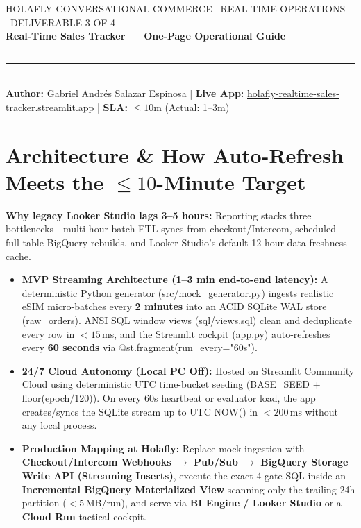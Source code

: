 \documentclass[10pt,letterpaper]{article}
\newcommand{\eyebrow}[1]{{\fontfamily{pcr}\selectfont\fontsize{7.2}{8.5}\selectfont\color{graphite}\MakeUppercase{#1}}}
\newcommand{\code}[1]{{\fontfamily{pcr}\selectfont\footnotesize\color{ink}#1}}
\newcommand{\hbullet}{\textcolor{holaflyred}{\rule[0.45ex]{0.40ex}{0.40ex}}}
\begin{document}
\fontsize{8.35}{10.5}\selectfont

\eyebrow{Holafly Conversational Commerce \textperiodcentered\ Real-Time Operations \textperiodcentered\ Deliverable 3 of 4}\\[1.5pt]
{\fontsize{14.8}{17}\selectfont\bfseries\color{ink}Real-Time Sales Tracker — One-Page Operational Guide}\\[2.5pt]
{\color{holaflyred}\rule{1.40in}{1.8pt}}{\color{hairline}\rule{\dimexpr\textwidth-1.40in\relax}{0.6pt}}\\[2.5pt]
{\fontsize{7.9}{9.4}\selectfont\color{iron}%
\textbf{Author:} Gabriel Andr\'es Salazar Espinosa \quad|\quad
\textbf{Live App:} \href{https://holafly-realtime-sales-tracker.streamlit.app/}{\code{holafly-realtime-sales-tracker.streamlit.app}} \quad|\quad
\textbf{SLA:} $\leq 10$m (Actual: 1--3m)}

\section{Architecture \& How Auto-Refresh Meets the $\leq 10$-Minute Target}
\textbf{Why legacy Looker Studio lags 3--5 hours:} Reporting stacks three bottlenecks---multi-hour batch ETL syncs from checkout/Intercom, scheduled full-table BigQuery rebuilds, and Looker Studio's default 12-hour data freshness cache.
\begin{itemize}[leftmargin=1.15em, itemsep=1.4pt, topsep=1.5pt, label=\hbullet]
  \item \textbf{MVP Streaming Architecture (1--3 min end-to-end latency):} A deterministic Python generator (\code{src/mock\_generator.py}) ingests realistic eSIM micro-batches every \textbf{2 minutes} into an ACID SQLite WAL store (\code{raw\_orders}). ANSI SQL window views (\code{sql/views.sql}) clean and deduplicate every row in $<15$\,ms, and the Streamlit cockpit (\code{app.py}) auto-refreshes every \textbf{60 seconds} via \code{@st.fragment(run\_every="60s")}.
  \item \textbf{24/7 Cloud Autonomy (Local PC Off):} Hosted on Streamlit Community Cloud using deterministic UTC time-bucket seeding (\code{BASE\_SEED + floor(epoch/120)}). On every 60s heartbeat or evaluator load, the app creates/syncs the SQLite stream up to \code{UTC NOW()} in $<200$\,ms without any local process.
  \item \textbf{Production Mapping at Holafly:} Replace mock ingestion with \textbf{Checkout/Intercom Webhooks $\rightarrow$ Pub/Sub $\rightarrow$ BigQuery Storage Write API (Streaming Inserts)}, execute the exact 4-gate SQL inside an \textbf{Incremental BigQuery Materialized View} scanning only the trailing 24h partition ($<5$\,MB/run), and serve via \textbf{BI Engine / Looker Studio} or a \textbf{Cloud Run} tactical cockpit.
\end{itemize}
\end{document}
